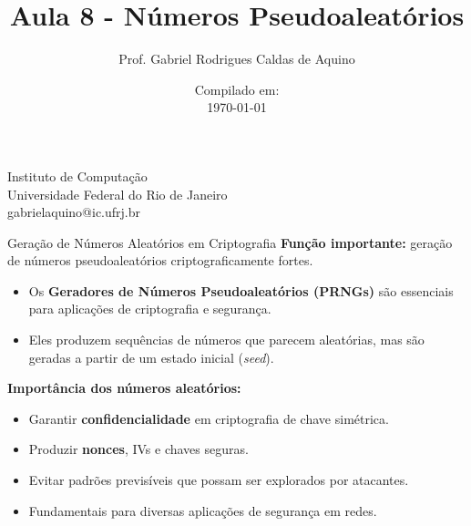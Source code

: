 \title{Aula 8 - Números Pseudoaleatórios}

\author{Prof. Gabriel Rodrigues Caldas de Aquino}

\institute
{
    Instituto de Computação \\
    Universidade Federal do Rio de Janeiro\\
    gabrielaquino@ic.ufrj.br%
}
\date{Compilado em: \\ \today} %




\begin{frame}
    \titlepage
\end{frame}

\begin{frame}{Geração de Números Aleatórios em Criptografia}
\textbf{Função importante:} geração de números pseudoaleatórios criptograficamente fortes.

\medskip
\begin{itemize}
    \item Os \textbf{Geradores de Números Pseudoaleatórios (PRNGs)} são essenciais para aplicações de criptografia e segurança.
    \item Eles produzem sequências de números que parecem aleatórias, mas são geradas a partir de um estado inicial (\textit{seed}).
\end{itemize}

\medskip
\textbf{Importância dos números aleatórios:}
\begin{itemize}
    \item Garantir \textbf{confidencialidade} em criptografia de chave simétrica.
    \item Produzir \textbf{nonces}, IVs e chaves seguras.
    \item Evitar padrões previsíveis que possam ser explorados por atacantes.
    \item Fundamentais para diversas aplicações de segurança em redes.
\end{itemize}
\end{frame}

